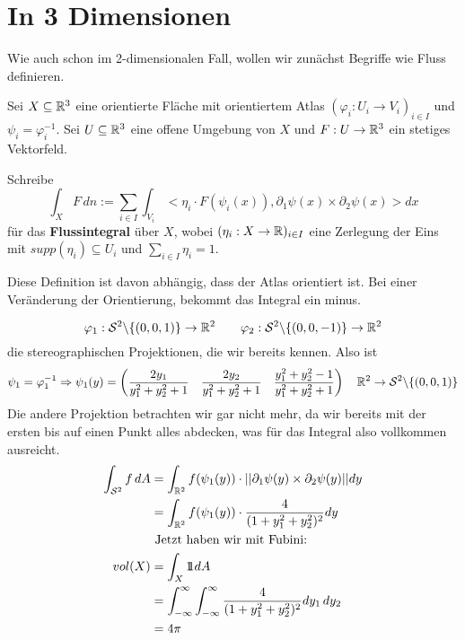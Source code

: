\documentclass[main.tex]{subfiles}
\begin{document}
\section{In 3 Dimensionen}

Wie auch schon im 2-dimensionalen Fall, wollen wir zunächst Begriffe wie Fluss definieren.

\begin{Definition}[Flussintegral]
  Sei $X \subseteq \mathbb{R}^3$ eine orientierte Fläche mit orientiertem Atlas $(\varphi_i : U_i \to V_i)_{i \in I}$ und $\psi_i = \varphi_i^{-1}$. Sei $U \subseteq \mathbb{R}^3$ eine offene Umgebung von $X$ und $F: U \to \mathbb{R}^3$ ein stetiges Vektorfeld.

  Schreibe
  $$\int_X F \, dn := \sum \limits_{i \in I} \int_{V_i} <\eta_i \cdot F(\psi_i(x)), \partial_1 \psi(x) \times \partial_2 \psi(x)> dx$$
  für das \textbf{Flussintegral} über $X$, wobei $(\eta_i: X \to \mathbb{R})_{i \in I}$ eine Zerlegung der Eins mit $supp(\eta_i) \subseteq U_i$ und $\sum \limits_{i \in I} \eta_i = 1$.

  Diese Definition ist davon abhängig, dass der Atlas orientiert ist. Bei einer Veränderung der Orientierung, bekommt das Integral ein minus.
\end{Definition}

\begin{Beispiel}[$X = \mathcal{S}^2 \subseteq \R^3$]
  $$\varphi_1 : \mathcal{S}^2 \backslash \{(0,0,1)\} \to \mathbb{R}^2 \qquad \varphi_2 : \mathcal{S}^2 \backslash \{(0,0,-1)\} \to \mathbb{R}^2$$
  die stereographischen Projektionen, die wir bereits kennen. Also ist
  $$\psi_1 = \varphi_1^{-1} \Rightarrow \psi_1(y) = \begin{pmatrix}
    \dfrac{2y_1}{y_1^2 + y_2^2 + 1} & \dfrac{2y_2}{y_1^2 + y_2^2 + 1} & \dfrac{y_1^2 + y_2^2 - 1}{y_1^2 + y_2^2 + 1}
  \end{pmatrix} \quad \mathbb{R}^2 \to \mathcal{S}^2 \backslash \{(0,0,1)\}$$
  Die andere Projektion betrachten wir gar nicht mehr, da wir bereits mit der ersten bis auf einen Punkt alles abdecken, was für das Integral also vollkommen ausreicht.
  $$\begin{aligned}
    \int_{\mathcal{S}^2} f \, dA & = \int_{\mathbb{R}^2} f(\psi_1(y)) \cdot ||\partial_1 \psi(y) \times \partial_2 \psi(y)|| dy \\
    & =  \int_{\mathbb{R}^2} f(\psi_1(y)) \cdot \dfrac{4}{(1 + y_1^2 + y_2^2)^2} dy \\
    & \text{ Jetzt haben wir mit Fubini:} \\
    vol(X) & = \int_X 1\!\!1 dA \\
    & = \int_{-\infty}^\infty \int_{-\infty}^\infty \dfrac{4}{(1 + y_1^2 + y_2^2)^2} dy_1 \, dy_2 \\
    & = 4\pi
  \end{aligned}$$
\end{Beispiel}
\end{document}

